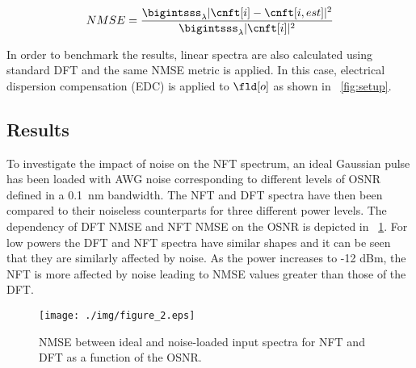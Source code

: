 \begin{equation}
 NMSE = \dfrac{ \bigintsss_{\lambda}
 |\cnft[i] - \cnft[i,est]|^2}{\bigintsss_{\lambda}|\cnft[i]|^2}
\end{equation}

In order to benchmark the results, linear spectra are also calculated using
standard DFT and the same NMSE metric is applied. In this case, electrical
dispersion compensation (EDC) is applied to $\fld[o]$ as shown in
\figurename~\ref{fig:setup}.

\subsection{Results}

To investigate the impact of noise on the \ac{NFT} spectrum, an ideal Gaussian
pulse has been loaded with AWG noise corresponding to different levels of OSNR
defined in a 0.1~nm bandwidth. The \ac{NFT} and DFT spectra have then been
compared to their noiseless counterparts
for three different power levels. The dependency of DFT NMSE
and \ac{NFT} NMSE on the OSNR is depicted in \figurename~\ref{fig:osnrSweep}.
For low powers the DFT and \ac{NFT} spectra have similar shapes and it can be
seen that they are similarly affected by noise. As the power increases to -12
dBm, the \ac{NFT} is more affected by noise leading to NMSE values greater than
those of the DFT.
%
\begin{figure}[htbp]
\centering
    \texttt{[image: ./img/figure\_2.eps]}
    \caption{NMSE between ideal and noise-loaded input spectra for \ac{NFT}
    and DFT as a function of the OSNR.}
    \label{fig:osnrSweep}
\end{figure}

